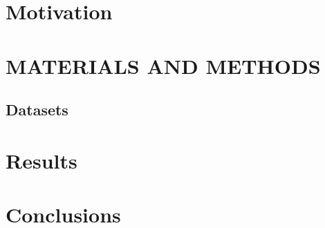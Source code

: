 \documentclass[a0,landscape]{a0poster}
\begin{document}
\begin{multicols}{4}

\color{DarkSlateGray} %


\section*{Motivation}


\section*{MATERIALS AND METHODS}


\subsection*{Datasets}


\section*{Results}



\color{SaddleBrown} %

\section*{Conclusions}


\end{multicols}
\end{document}
